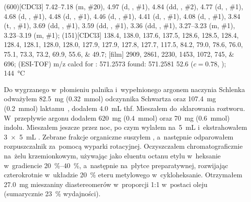 \begin{fullexp}
	\NMR(600)[CDCl3] \numrange{7.42}{7.18} (m, \#{20}), \num{4.97} (d, , \#{1}), \num{4.84} (dd, , \#{2}), \num{4.77} (d, , \#{1}), \num{4.68} (d, , \#{1}), \num{4.48} (d, , \#{1}), \num{4.46} (d, , \#{1}), \num{4.41} (d, , \#{1}), \num{4.08} (d, , \#{1}), \num{3.84} (t, , \#{1}), \num{3.69} (dd, , \#{1}), \num{3.59} (dd, , \#{1}), \num{3.36} (dd, , \#{1}), \numrange{3.27}{3.23} (m, \#{1}), \numrange{3.23}{3.19} (m, \#{1}); 
	(151)[CDCl3] \numlist{138.4; 138.0; 137.6; 137.5; 128.6; 128.5; 128.4; 128.4; 128.1; 128.0; 128.0; 127.9; 127.9; 127.8; 127.7; 117.5; 84.2; 79.0; 78.6; 76.0; 75.1; 73.3; 73.2; 69.9; 55.6; 49.7}; 
	[film] \numlist{2909; 2861; 2230; 1453; 1072; 745; 696}; 
	 (ESI-TOF) m/z calcd for : \num{571.2573} found: \num{571.2581}
  \data{[$\alpha^{23}_D$]~$=$} \num{52.6} ($c = 0.78$, );
   \SI{144}{\celsius}
\end{fullexp}

Do wygrzanego w~płomieniu palnika i~wypełnionego argonem naczynia Schlenka odważyłem
  \SI{82.5}{\mg} (\SI{0.32}{\mmol}) odczynnika Schwartza oraz \SI{107.4}{\mg} (\SI{0.2}{\mmol})
  laktamu~, dodałem \SI{4.0}{\mL} \gls{thf}.
Mieszałem do~sklarowania roztworu.
W~przepływie argonu dodałem \SI{620}{\mg} (\SI{0.4}{\mmol})  oraz
  \SI{70}{\mg} (\SI{0.6}{\mmol}) indolu.
Mieszałem jeszcze przez noc, po czym wylałem na~\SI{5}{\mL}  i~ekstrahowałem
  \SI[product-units = single]{3 x 5}{\mL} .
Zebrane frakcje organiczne suszyłem , a~następnie odparowałem rozpuszczalnik za~pomocą
  wyparki rotacyjnej.
Oczyszczałem chromatograficznie na~żelu krzemionkowym, używając jako eluentu octanu etylu
  w~heksanie w~gradiencie \SIrange{20}{40}{\percent}, a~następnie na~płytce preparatywnej,
  rozwijając czterokrotnie w~układzie \SI{20}{\percent} eteru 
  metylowego w~cykloheksanie.
Otrzymałem \SI{27.0}{\mg} mieszaniny diastereomerów w~proporcji 1:1 w~postaci oleju
  (sumarycznie \SI{23}{\percent} wydajności).

